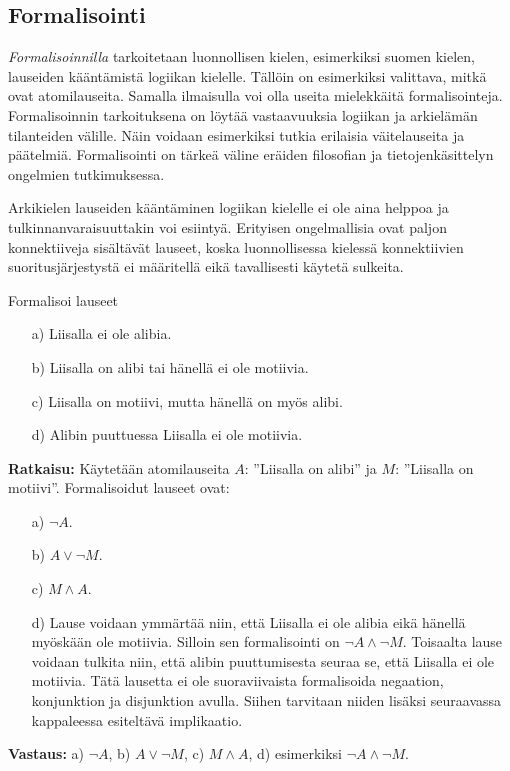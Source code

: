\subsection*{Formalisointi}
{\em Formalisoinnilla} tarkoitetaan luonnollisen kielen, esimerkiksi suomen kielen, lauseiden kääntämistä logiikan kielelle. Tällöin on esimerkiksi valittava, mitkä ovat atomilauseita. Samalla ilmaisulla voi olla useita mielekkäitä formalisointeja. Formalisoinnin tarkoituksena on löytää vastaavuuksia logiikan ja arkielämän tilanteiden välille. Näin voidaan esimerkiksi tutkia erilaisia väitelauseita ja päätelmiä. Formalisointi on tärkeä väline eräiden filosofian ja tietojenkäsittelyn ongelmien tutkimuksessa.

Arkikielen lauseiden kääntäminen logiikan kielelle ei ole aina helppoa ja tulkinnanvaraisuuttakin voi esiintyä. Erityisen ongelmallisia ovat paljon konnektiiveja sisältävät lauseet, koska luonnollisessa kielessä konnektiivien suoritusjärjestystä ei määritellä eikä tavallisesti käytetä sulkeita.

\begin{esimerkki}
Formalisoi lauseet
\begin{itemize}
\item[a)] Liisalla ei ole alibia. 
\item[b)] Liisalla on alibi tai hänellä ei ole motiivia.
\item[c)] Liisalla on motiivi, mutta hänellä on myös alibi.
\item[d)] Alibin puuttuessa Liisalla ei ole motiivia. 
\end{itemize}

{\bf Ratkaisu:}
Käytetään atomilauseita $A$: ''Liisalla on alibi'' ja $M$: ''Liisalla on motiivi''.	
Formalisoidut lauseet ovat:
\begin{itemize}
\item[a)] $\lnot A$.
\item[b)] $A \lor \lnot M$.
\item[c)] $M\land A$.
\item[d)] Lause voidaan ymmärtää niin, että Liisalla ei ole alibia eikä hänellä myöskään ole motiivia. Silloin sen formalisointi on $\lnot A \land \lnot M$. Toisaalta lause voidaan tulkita niin, että alibin puuttumisesta seuraa se, että Liisalla ei ole motiivia. Tätä lausetta ei ole suoraviivaista formalisoida negaation, konjunktion ja disjunktion avulla. Siihen tarvitaan niiden lisäksi seuraavassa kappaleessa esiteltävä implikaatio. 
\end{itemize}

{\bf Vastaus:}
a) $\lnot A$, b) $A \lor \lnot M$, c) $M\land A$, d) esimerkiksi 
$\lnot A \land \lnot M$.
\end{esimerkki}


